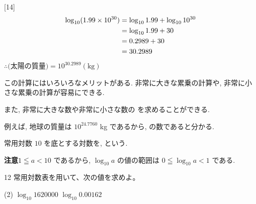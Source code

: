 \documentclass[14pt,dvipdfmx]{jsarticle}
\begin{document}
\vfill
\nextpage


\begin{answerbox}{}[14]
  \begin{align*}
    \vspace{-1em}
    \log_{10} (1.99 \times 10^{30}) &= \log_{10} 1.99 + \log_{10} 10^{30} \\
    &= \log_{10} 1.99 + 30 \\
    &= 0.2989 + 30 \\
    &= 30.2989
  \end{align*}
  $\therefore \text{(太陽の質量)} = 10^{30.2989}(\text{kg})$
\end{answerbox}
\vspace{1em}

この計算にはいろいろなメリットがある. 非常に大きな累乗の計算や, 非常に小さな累乗の計算が容易にできる.

また, 非常に大きな数や非常に小さな数の  を求めることができる.

例えば, 地球の質量は $10^{24.7760}$ kg であるから, の数であると分かる.
\vspace{2em}


\begin{definitionbox}{常用対数}
  $10$ を底とする対数を, という.
\end{definitionbox}

\vspace{0.15em}

\vspace{0.08em}
\textbf{注意}\quad $1 \leqq a < 10$ であるから, $\log_{10} a$ の値の範囲は
$0 \leqq \log_{10} a < 1$ である.

\vspace{0.25em}

\vfill
\nextpage


\begin{exampleprob}{12}
  常用対数表を用いて、次の値を求めよ。
  \begin{tasks}[label=(\arabic*), label-width=1.6zw, item-indent=2zw, after-item-skip=0.08em](2)
    \task $\log_{10} 1620000$
    \task $\log_{10} 0.00162$
  \end{tasks}
\end{exampleprob}
\end{document}
